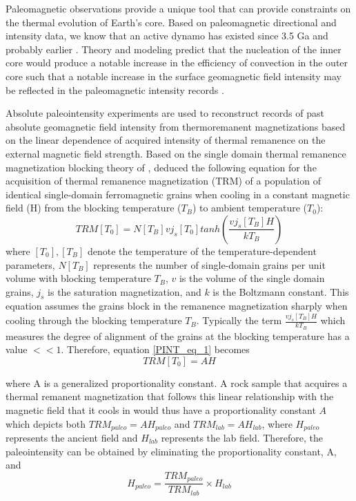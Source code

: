  Paleomagnetic observations provide a unique tool that can provide constraints on the thermal evolution of Earth’s core. Based on paleomagnetic directional and intensity data, we know that an active dynamo has existed since 3.5 Ga \citep{Selkin2007a, Biggin2011a, Tarduno2014a, Brenner2020a, Brenner2022a} and probably earlier \citep{Tarduno2015a}. Theory and modeling predict that the nucleation of the inner core would produce a notable increase in the efficiency of convection in the outer core such that a notable increase in the surface geomagnetic field intensity may be reflected in the paleomagnetic intensity records \cite[e.g.][]{Labrosse2003a, Aubert2009a, Driscoll2016a, Landeau2022a}. 

Absolute paleointensity experiments are used to reconstruct records of past absolute geomagnetic field intensity from thermoremanent magnetizations based on the linear dependence of acquired intensity of thermal remanence on the external magnetic field strength. Based on the single domain thermal remanence magnetization blocking theory of \cite{Neel1955a}, \cite{Butler1992a} deduced the following equation for the acquisition of thermal remanence magnetization (TRM) of a population of identical single-domain ferromagnetic grains when cooling in a constant magnetic field (H) from the blocking temperature ($T_B$) to ambient temperature ($T_0$):
\begin{equation*}
    TRM [T_0] = N[T_B] v j_s [T_0] tanh(\frac{v j_s [T_B]H}{k T_B})
\label{PINT_eq_1}
\end{equation*}
where $[T_0], [T_B]$ denote the temperature of the temperature-dependent parameters, $N[T_B]$ represents the number of single-domain grains per unit volume with blocking temperature $T_B$, $v$ is the volume of the single domain grains, $j_s$ is the saturation magnetization, and $k$ is the Boltzmann constant. This equation assumes the grains block in the remanence magnetization sharply when cooling through the blocking temperature $T_B$. Typically the term $\frac{v j_s [T_B]H}{k T_B}$ which measures the degree of alignment of the grains at the blocking temperature has a value $<<1$. Therefore, equation \ref{PINT_eq_1} becomes 
\begin{equation*}
    TRM [T_0] = AH
\label{PINT_eq_2}
\end{equation*}

where A is a generalized proportionality constant. A rock sample that acquires a thermal remanent magnetization that follows this linear relationship with the magnetic field that it cools in would thus have a proportionality constant $A$ which depicts both $TRM_{paleo}=AH_{paleo}$ and $TRM_{lab}=AH_{lab}$, where $H_{paleo}$ represents the ancient field and $H_{lab}$ represents the lab field. Therefore, the paleointensity can be obtained by eliminating the proportionality constant, A, and 
\begin{equation*}
    H_{paleo} = \frac{TRM_{paleo}}{TRM_{lab}} \times H_{lab}
\label{PINT_eq_3}
\end{equation*}

